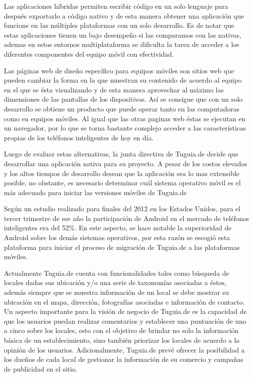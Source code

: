 Las aplicaciones híbridas permiten escribir código en un solo lenguaje para después exportarlo a código nativo y de esta manera obtener una aplicación que funcione en las múltiples plataformas con un solo desarrollo. Es de notar que estas aplicaciones tienen un bajo desempeño si las comparamos con las nativas, ademas en estos entornos multiplataforma se dificulta la tarea de acceder a los diferentes componentes del equipo móvil con efectividad. 

Las páginas web de diseño específico para equipos móviles son sitios web que pueden cambiar la forma en la que muestran su contenido de acuerdo al equipo en el que se ésta visualizando y de esta manera aprovechar al máximo las dimensiones de las pantallas de los dispositivos. Así se consigue que con un solo desarrollo se obtiene un producto que puede operar tanto en las computadoras como en equipos móviles. Al igual que las otras paginas web éstas se ejecutan en un navegador, por lo que se torna bastante complejo acceder a las características propias de los teléfonos inteligentes de hoy en día. 

Luego de evaluar estas alternativas, la junta directiva de Tuguia.de decide que desarrollar una aplicación nativa para su proyecto. A pesar de los costos elevados y los altos tiempos de desarrollo desean que la aplicación sea lo mas extensible posible, no obstante, es necesario determinar cuál sistema operativo móvil es el más adecuado para iniciar las versiones móviles de Tuguia.de

Según un estudio realizado para finales del 2012 en los Estados Unidos,\cite{NTD} para el tercer trimestre de ese año la participación de Android en el mercado de teléfonos inteligentes era del 52\%. En este aspecto, se hace notable la superioridad de Android sobre los demás sistemas operativos, por esta razón se escogió esta plataforma para iniciar el proceso de migración de Tuguia.de a las plataformas móviles.

Actualmente Tuguia.de cuenta con funcionalidades tales como búsqueda de locales dadas sus ubicación y/o una serie de taxonomías asociadas a éstos, además siempre que se muestra información de un local se debe mostrar su ubicación en el mapa, dirección, fotografías asociadas e información de contacto. Un aspecto importante para la visión de negocio de Tuguia.de es la capacidad de que los usuarios puedan realizar comentarios y establecer una puntuación de uno a cinco  sobre los locales, esto con el objetivo de brindar no solo la información básica de un establecimiento, sino también priorizar los locales de acuerdo a la opinión de los usuarios. Adicionalmente, Tuguia.de prevé ofrecer la posibilidad a los dueños de cada local de gestionar la información de su comercio y campañas de publicidad en el sitio.

